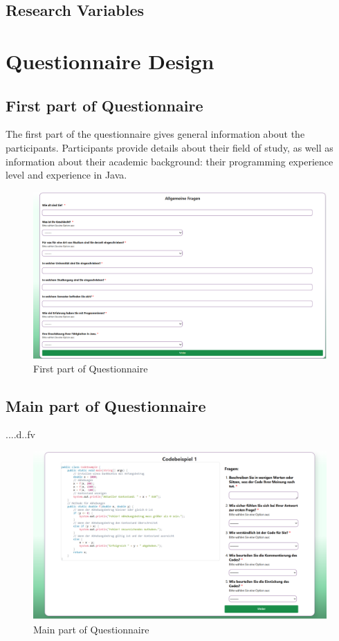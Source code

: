 \subsection{Research Variables}



\section{Questionnaire Design}


\subsection{First part of Questionnaire}
The first part of the questionnaire gives general information about the participants. 
Participants provide details about their field of study, as well as information about their academic background: their programming experience level and experience in Java.

\begin{figure} [H]
  \centering
  \includegraphics[scale=0.45]{figures/allgemein.png}
  \caption{First part of Questionnaire}
  \label{fig:AnhangsChor}
\end{figure}


\subsection{Main part of Questionnaire}

....d..fv

\begin{figure} [H]
  \centering
  \includegraphics[scale=0.45]{figures/main_p.png}
  \caption{Main part of Questionnaire}
  \label{fig:AnhangsChor}
\end{figure}



